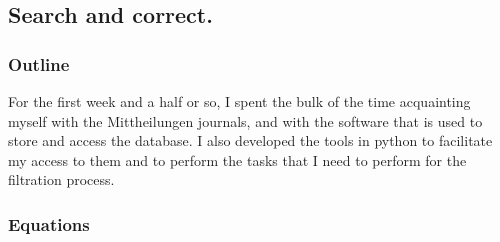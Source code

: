 \documentclass[12pt]{article}
\begin{document}
\subsection{Search and correct.}

\subsubsection{Outline}

For the first week and a half or so, I spent the bulk of the time acquainting myself with the Mittheilungen journals, and with the software that is used to store and access the database. I also developed the tools in python to facilitate my access to them and to perform the tasks that I need to perform for the filtration process.

\subsubsection{Equations}

\begin{equation}
    
\end{equation}
\end{document}
